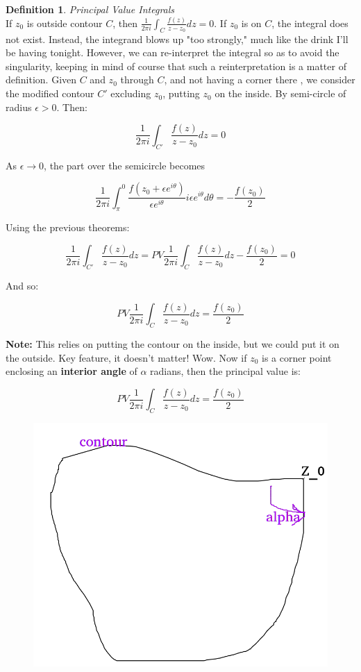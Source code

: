 \documentclass{article}
\theoremstyle{definition}
\newtheorem{definition}{Definition}[section]
\newcommand{\Def}[2]{
\begin{shaded*}
\begin{definition}{\textit{#1}}\\#2\end{definition}
\end{shaded*}
}
\begin{document}
\Def{Principal Value Integrals}{
If $z_0$ is outside contour $C$, then $\frac{1}{2\pi i}\int_{C} \frac{f(z)}{z-z_0}dz = 0$. If $z_0$ is on $C$, the integral does not exist. Instead, the integrand blows up "too strongly," much like the drink I'll be having tonight. However, we can re-interpret the integral so as to avoid the singularity, keeping in mind of course that such a reinterpretation is a matter of definition. Given $C$ and $z_0$ through $C$, and not having a corner there , we consider the modified contour $C'$ excluding $z_0$, putting $z_0$ on the inside. By semi-circle of radius $\epsilon>0$. Then:

$$\frac{1}{2\pi i}\int_{C'} \frac{f(z)}{z-z_0}dz = 0$$

As $\epsilon \to 0$, the part over the semicircle becomes 

$$\frac{1}{2\pi i}\int_{\pi}^0 \frac{f(z_0 + \epsilon e^{i\theta})}{\epsilon e^{i\theta}} i \epsilon e^{i\theta} d\theta = -\frac{f(z_0)}{2}$$

Using the previous theorems:

$$\frac{1}{2\pi i}\int_{C'} \frac{f(z)}{z-z_0}dz = PV \frac{1}{2\pi i}\int_{C} \frac{f(z)}{z-z_0}dz -\frac{f(z_0)}{2} =  0$$

And so:

$$PV \frac{1}{2\pi i}\int_{C} \frac{f(z)}{z-z_0}dz = \frac{f(z_0)}{2}$$

\textbf{Note:} This relies on putting the contour on the inside, but we could put it on the outside. Key feature, it doesn't matter! Wow. Now if $z_0$ is a corner point enclosing an \textbf{interior angle} of $\alpha$ radians, then the principal value is:

$$PV \frac{1}{2\pi i}\int_{C} \frac{f(z)}{z-z_0}dz = \frac{f(z_0)}{2}$$

\begin{figure}[H]
	\centering
	\includegraphics[width=0.5\linewidth]{angle_contour}
	\caption{}
	\label{fig:anglecontour}
\end{figure}

}
\end{document}
